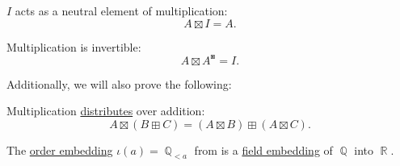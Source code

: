 \begin{proposition}
\begin{thmenum}[resume=thm:field_of_real_numbers]
      \( I \) acts as a neutral element of multiplication:
    \begin{equation}\label{eq:thm:field_of_real_numbers/multiplication_neutral}
      A \boxtimes I = A.
    \end{equation}

     Multiplication is invertible:
    \begin{equation}\label{eq:thm:field_of_real_numbers/multiplication_invertible}
      A \boxtimes A^\boxast = I.
    \end{equation}
  \end{thmenum}

  Additionally, we will also prove the following:
  \begin{thmenum}[resume=thm:field_of_real_numbers]
     Multiplication \hyperref[def:semiring]{distributes} over addition:
    \begin{equation}\label{eq:thm:field_of_real_numbers/distributivity}
      A \boxtimes (B \boxplus C) = (A \boxtimes B) \boxplus (A \boxtimes C).
    \end{equation}

     The \hyperref[def:preordered_set/homomorphism]{order embedding} \( \iota(a) = \BbbQ_{<a} \) from  is a \hyperref[def:field/homomorphism]{field embedding} of \( \BbbQ \) into \( \BbbR \).
  \end{thmenum}
\end{proposition}
